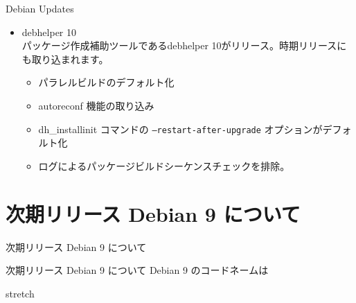 \begin{frame}{Debian Updates}

\begin{itemize}
\item debhelper 10
　\\
パッケージ作成補助ツールであるdebhelper 10がリリース。時期リリースにも取り込まれます。
\begin{itemize}


\item パラレルビルドのデフォルト化


\item autoreconf 機能の取り込み


\item dh\_installinit コマンドの \texttt{--restart-after-upgrade} オプションがデフォルト化


\item ログによるパッケージビルドシーケンスチェックを排除。

\end{itemize}
\end{itemize}
\end{frame}

\section{次期リリース Debian 9 について}
\begin{frame}\begin{center}\Huge{次期リリース Debian 9 について}\end{center}\end{frame}

\begin{frame}{次期リリース Debian 9 について}%
Debian 9 のコードネームは \pause \\
 \begin{center}
{\Huge stretch} \pause
 \end{center}
\end{frame}


